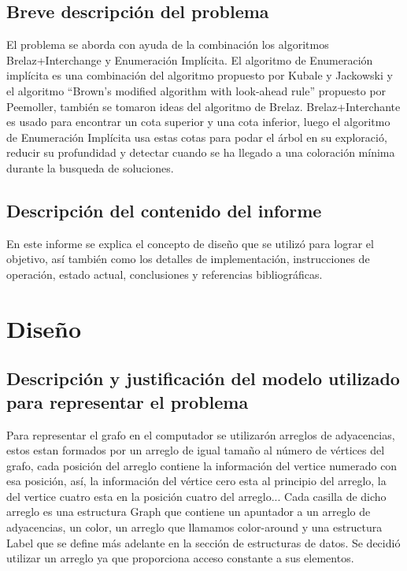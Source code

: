 \documentclass[a4paper,10pt]{article}
\begin{document}
\subsection{Breve descripción del problema}
El problema se aborda con ayuda de la combinación los algoritmos 
Brelaz+Interchange y Enumeraci\'on Impl\'icita. El algoritmo de
Enumeraci\'on impl\'icita es una combinaci\'on del algoritmo propuesto por Kubale y
Jackowski y el algoritmo ``Brown's modified algorithm with look-ahead
rule'' propuesto por Peemoller, tambi\'en se tomaron ideas del algoritmo
de Brelaz.
Brelaz+Interchante es usado para encontrar un cota superior y una
cota inferior, luego el algoritmo de Enumeración Implícita usa estas
cotas para podar el \'arbol en su exploració, reducir su profundidad
y detectar cuando se ha llegado a una coloración mínima durante la
busqueda de soluciones.

\subsection{Descripción del contenido del informe}
En este informe se explica el concepto de diseño que se utilizó
para lograr el objetivo, así también como los detalles de implementación, 
instrucciones de operación, estado actual, conclusiones y referencias bibliográficas.

\section{Diseño}

\subsection{Descripción y justificación del modelo utilizado para
  representar el problema}

  Para representar el grafo en el computador se utilizar\'on arreglos de
  adyacencias, estos estan formados por un arreglo de igual tamaño al número de
  vértices del grafo, cada posici\'on del arreglo contiene la
  informaci\'on del vertice numerado con esa posici\'on, as\'i, la
  informaci\'on del v\'ertice cero esta al principio del arreglo, la del
  vertice cuatro esta en la posici\'on cuatro del arreglo... Cada
  casilla de dicho arreglo es una estructura Graph que contiene un
  apuntador a un arreglo de adyacencias, un color, un arreglo que
  llamamos color-around y una estructura Label que se define m\'as
  adelante en la secci\'on de estructuras de datos. Se decidió utilizar
  un arreglo ya que proporciona acceso constante a sus elementos.\\
\end{document}
